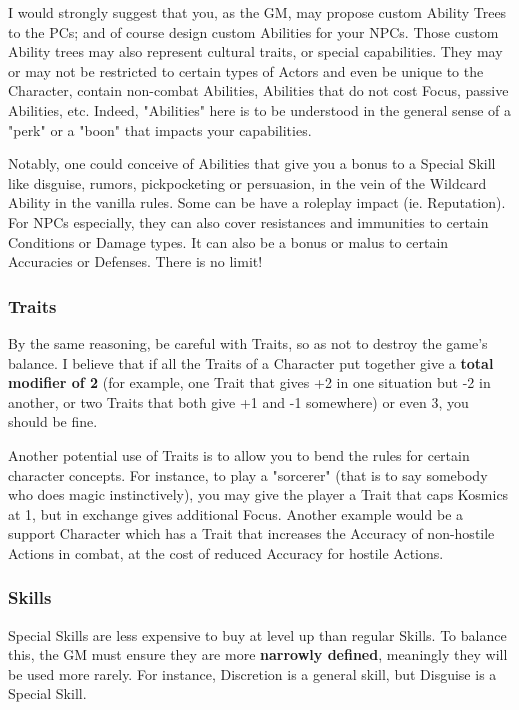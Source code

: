 \label{balancing_abilities}

I would strongly suggest that you, as the GM, may propose custom Ability Trees to the PCs; and of course design custom Abilities for your NPCs. Those custom Ability trees may also represent cultural traits, or special capabilities. They may or may not be restricted to certain types of Actors and even be unique to the Character, contain non-combat Abilities, Abilities that do not cost Focus, passive Abilities, etc. Indeed, "Abilities" here is to be understood in the general sense of a "perk" or a "boon" that impacts your capabilities.

Notably, one could conceive of Abilities that give you a bonus to a Special Skill like disguise, rumors, pickpocketing or persuasion, in the vein of the Wildcard Ability in the vanilla rules. Some can be have a roleplay impact (ie. Reputation). For NPCs especially, they can also cover resistances and immunities to certain Conditions or Damage types. It can also be a bonus or malus to certain Accuracies or Defenses. There is no limit!

\subsubsection{Traits}

By the same reasoning, be careful with Traits, so as not to destroy the game's balance. I believe that if all the Traits of a Character put together give a \textbf{total modifier of 2} (for example, one Trait that gives +2 in one situation but -2 in another, or two Traits that both give +1 and -1 somewhere) or even 3, you should be fine. 

Another potential use of Traits is to allow you to bend the rules for certain character concepts. For instance, to play a "sorcerer" (that is to say somebody who does magic instinctively), you may give the player a Trait that caps Kosmics at 1, but in exchange gives additional Focus. Another example would be a support Character which has a Trait that increases the Accuracy of non-hostile Actions in combat, at the cost of reduced Accuracy for hostile Actions.


\subsubsection{Skills}
\label{balancing_skills}

Special Skills are less expensive to buy at level up than regular Skills. To balance this, the GM must ensure they are more \textbf{narrowly defined}, meaningly they will be used more rarely. For instance, Discretion is a general skill, but Disguise is a Special Skill.

